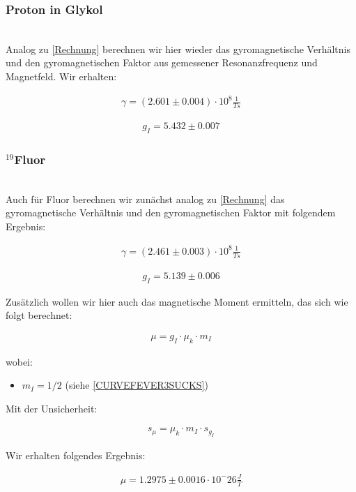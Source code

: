 \documentclass[12pt]{article}
\begin{document}
\subsubsection{Proton in Glykol}
\ \\

Analog zu \ref{Rechnung} berechnen wir hier wieder das gyromagnetische Verhältnis und den gyromagnetischen Faktor aus gemessener Resonanzfrequenz und Magnetfeld. Wir erhalten:

\begin{align*}
\gamma = (2.601\pm 0.004) \cdot 10^8 \frac{1}{Ts}
\end{align*}

\begin{align*}
g_I = 5.432  \pm 0.007
\end{align*}

\subsubsection{$^{19}$Fluor} \label{MEINEXISTEINARSCH}
\ \\

Auch für Fluor berechnen wir zunächst analog zu \ref{Rechnung} das gyromagnetische Verhältnis und den gyromagnetischen Faktor mit folgendem Ergebnis:

\begin{align*}
\gamma = (2.461\pm 0.003) \cdot 10^8 \frac{1}{Ts}
\end{align*}

\begin{align*}
g_I = 5.139  \pm 0.006
\end{align*}

Zusätzlich wollen wir hier auch das magnetische Moment ermitteln, das sich wie folgt berechnet:

\begin{align*}
\mu = g_I \cdot \mu_k \cdot m_I
\end{align*}

wobei:
\begin{itemize}
	\item $m_I = 1/2$ (siehe \ref{CURVEFEVER3SUCKS})
\end{itemize}
Mit der Unsicherheit:

\begin{align*}
s_\mu = \mu_k \cdot m_I \cdot s_{g_I}
\end{align*}

Wir erhalten folgendes Ergebnis:

\begin{align*}
\mu = 1.2975 \pm 0.0016   \cdot 10^-26 \frac{J}{T}
\end{align*}
\end{document}

